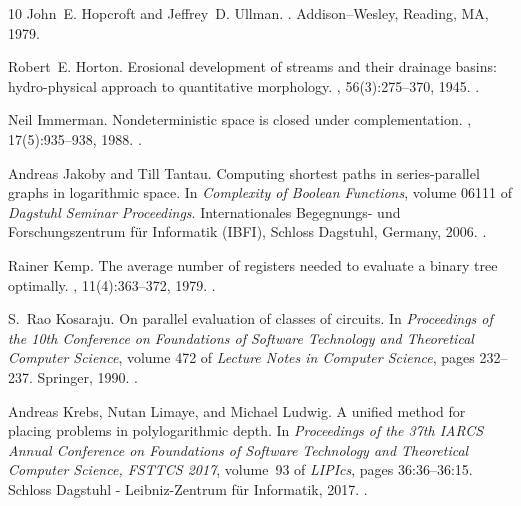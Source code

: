 \documentclass[a4paper,UKenglish,cleveref, autoref, thm-restate, numberwithinsect]{lipics-v2021}
\begin{document}
\begin{thebibliography}{10}
John~E. Hopcroft and Jeffrey~D. Ullman.
.
\newblock Addison--Wesley, Reading, MA, 1979.

Robert~E. Horton.
\newblock Erosional development of streams and their drainage basins:
  hydro-physical approach to quantitative morphology.
, 56(3):275--370, 1945.
\newblock \href {https://doi.org/10.1130/0016-7606(1945)56[275:EDOSAT]2.0.CO;2}
  {}.

Neil Immerman.
\newblock Nondeterministic space is closed under complementation.
, 17(5):935--938, 1988.
\newblock \href {https://doi.org/10.1137/0217058} {}.

Andreas Jakoby and Till Tantau.
\newblock Computing shortest paths in series-parallel graphs in logarithmic
  space.
\newblock In {\em Complexity of Boolean Functions}, volume 06111 of {\em
  Dagstuhl Seminar Proceedings}. Internationales Begegnungs- und
  Forschungszentrum f\"ur Informatik (IBFI), Schloss Dagstuhl, Germany, 2006.
\newblock \href {https://doi.org/10.4230/DagSemProc.06111.6}
  {}.

Rainer Kemp.
\newblock The average number of registers needed to evaluate a binary tree
  optimally.
, 11(4):363--372, 1979.
\newblock \href {https://doi.org/10.1007/BF00289094}
  {}.

S.~Rao Kosaraju.
\newblock On parallel evaluation of classes of circuits.
\newblock In {\em Proceedings of the 10th Conference on Foundations of Software
  Technology and Theoretical Computer Science}, volume 472 of {\em Lecture
  Notes in Computer Science}, pages 232--237. Springer, 1990.
\newblock \href {https://doi.org/10.1007/3-540-53487-3\_48}
  {}.

Andreas Krebs, Nutan Limaye, and Michael Ludwig.
\newblock A unified method for placing problems in polylogarithmic depth.
\newblock In {\em Proceedings of the 37th {IARCS} Annual Conference on
  Foundations of Software Technology and Theoretical Computer Science, {FSTTCS}
  2017}, volume~93 of {\em LIPIcs}, pages 36:36--36:15. Schloss Dagstuhl -
  Leibniz-Zentrum f{\"{u}}r Informatik, 2017.
\newblock \href {https://doi.org/10.4230/LIPICS.FSTTCS.2017.36}
  {}.


\end{thebibliography}
\end{document}
